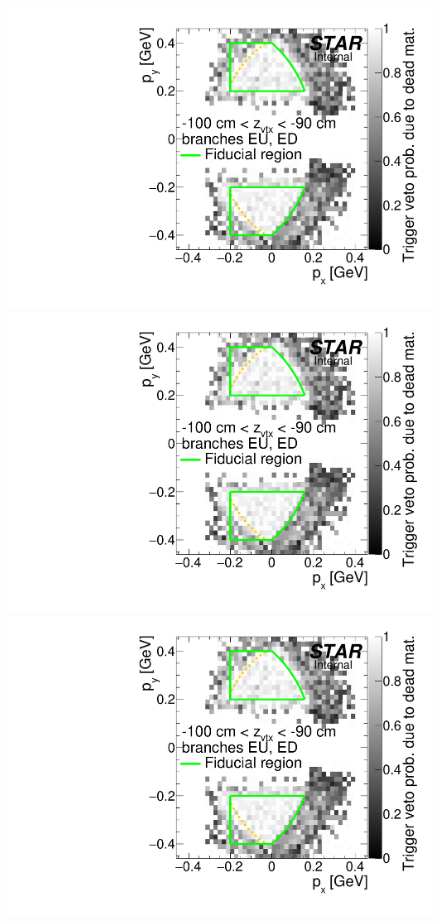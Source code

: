 \begin{figure}[hb]
{}~
\parbox{0.495\textwidth}{
  \centering
  \includegraphics[width=\linewidth,page=4]{graphics/corrections/mcDeadMatProbPxPy.pdf}\\
  \includegraphics[width=\linewidth,page=6]{graphics/corrections/mcDeadMatProbPxPy.pdf}\\
  \includegraphics[width=\linewidth,page=8]{graphics/corrections/mcDeadMatProbPxPy.pdf}
}%
\end{figure}
